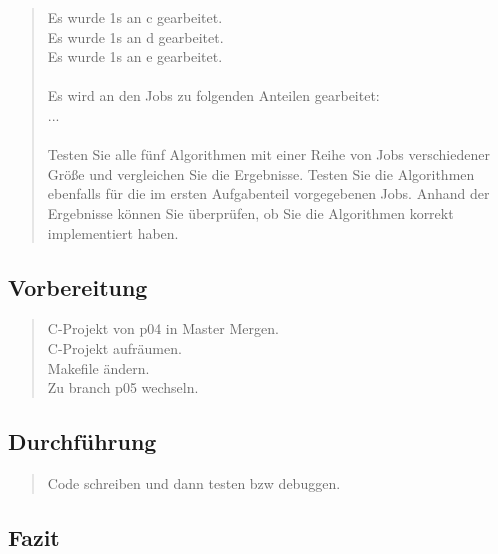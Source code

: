 \begin{quote}
			Es wurde 1s an c gearbeitet.\\
			Es wurde 1s an d gearbeitet.\\
			Es wurde 1s an e gearbeitet.\\ \\
			Es wird an den Jobs zu folgenden Anteilen gearbeitet:\\
			...\\ \\
			Testen Sie alle f\"unf Algorithmen mit einer Reihe von Jobs verschiedener Gr\"oße und vergleichen Sie die Ergebnisse. Testen Sie die Algorithmen ebenfalls f\"ur die im ersten Aufgabenteil vorgegebenen Jobs. Anhand der Ergebnisse k\"onnen Sie \"uberpr\"ufen, ob Sie die Algorithmen korrekt implementiert haben.\\
		\end{quote}
	\subsection{Vorbereitung}
		\begin{quote}
			C-Projekt von p04 in Master Mergen.\\
			C-Projekt aufr\"aumen.\\
			Makefile \"andern.\\
			Zu branch p05 wechseln.\\
		\end{quote}
	\subsection{Durchführung}
		\begin{quote}
			Code schreiben und dann testen bzw debuggen.
		\end{quote}
	\subsection{Fazit}
		\begin{quote}
			
		\end{quote}